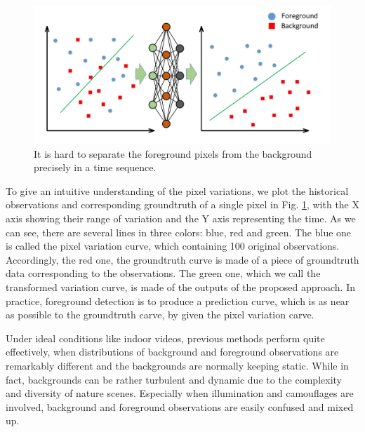 \documentclass[journal]{IEEEtran}
\newcommand{\reffig}[1]{Fig. \ref{#1}}
\begin{document}
\begin{figure}[!t]	%
\centering
    \includegraphics[width=\linewidth]{figure/fig1}
    \caption{It is hard to separate the foreground pixels from the background precisely in a time sequence.}
    \label{variation_chart}
\end{figure}


To give an intuitive understanding of the pixel variations, we plot the historical observations and corresponding groundtruth of a single pixel in  \reffig{variation_chart}, with the X axis showing their range of variation and the Y axis representing the time. 
As we can see, there are several lines in three colors: blue, red and green. 
The blue one is called the pixel variation curve, which containing 100 original observations. 
Accordingly, the red one, the groundtruth curve is made of a piece of groundtruth data corresponding to the observations. 
The green one, which we call the transformed variation curve, is made of the outputs of the proposed approach. 
In practice, foreground detection is to produce a prediction curve, which is as near as possible to the groundtruth carve, by given the pixel variation carve. 

Under ideal conditions like indoor videos, previous methods perform quite effectively, when distributions of background and foreground observations are remarkably different and the backgrounds are normally keeping static. 
While in fact, backgrounds can be rather turbulent and dynamic due to the complexity and diversity of nature scenes. 
Especially when illumination and camouflages are involved, background and foreground observations are easily confused and mixed up. 
\end{document}
